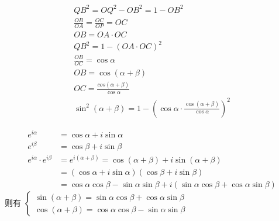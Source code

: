 \documentclass[answers]{exam}
\begin{document}
\begin{questions}
\begin{solution}
\begin{itemize}
\begin{minipage}{0.53\textwidth}
\begin{tikzpicture}[scale=2]
				      \end{tikzpicture}
			      \end{minipage}
			      \begin{minipage}{0.4\textwidth}
				      \begin{gather*}
					      QB^2 = OQ^2 - OB^2 = 1 - OB^2 \\
					      \frac{OB}{OA} = \frac{OC}{OP} = OC \\
					      OB = OA \cdot OC \\
					      QB^2 = 1 - (OA \cdot OC)^2 \\
					      \frac{OB}{OC} = \cos\alpha \\
					      OB = \cos(\alpha + \beta) \\
					      OC = \frac{cos(\alpha + \beta)}{\cos\alpha}\\
					      \sin^2(\alpha+\beta) = 1 - (\cos\alpha \cdot \frac{\cos(\alpha + \beta)}{\cos\alpha})^2
				      \end{gather*}
			      \end{minipage}
			      \begin{align*}
				      e^{i\alpha}                  & = \cos\alpha + i\sin\alpha                                                                 \\
				      e^{i\beta}                   & = \cos\beta + i\sin\beta                                                                   \\
				      e^{i\alpha} \cdot e^{i\beta} & = e^{i(\alpha + \beta)} = \cos(\alpha + \beta) + i\sin(\alpha + \beta)                     \\
				                                   & = (\cos\alpha + i\sin\alpha)(\cos\beta + i\sin\beta)                                       \\
				                                   & = \cos\alpha\cos\beta - \sin\alpha\sin\beta + i(\sin\alpha\cos\beta + \cos\alpha\sin\beta)
			      \end{align*}
			      则有
			      \begin{math}
				      \begin{cases}
					      \sin(\alpha + \beta) = \sin\alpha\cos\beta + \cos\alpha\sin\beta \\
					      \cos(\alpha + \beta) = \cos\alpha\cos\beta - \sin\alpha\sin\beta
				      \end{cases}
			      \end{math}
		\end{itemize}


\end{solution}
\end{questions}
\end{document}

